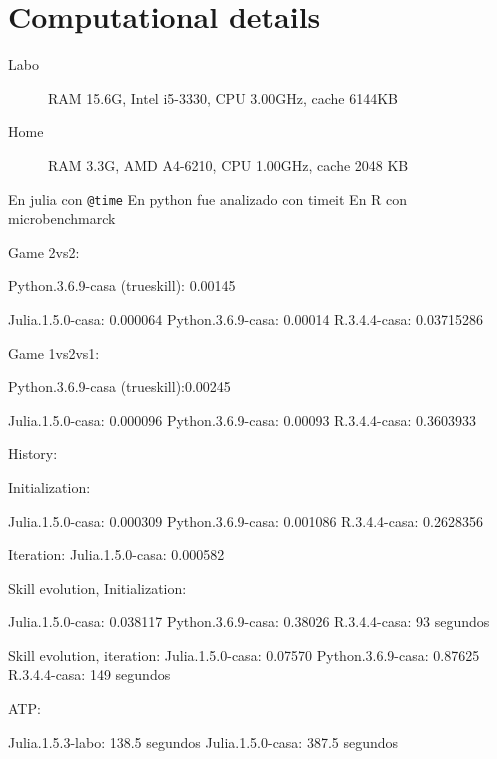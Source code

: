 \documentclass[article]{jss}
\begin{document}

\section*{Computational details}
% 


\begin{description}
 \item[Labo] RAM 15.6G, Intel i5-3330, CPU 3.00GHz, cache 6144KB
 \item[Home] RAM 3.3G, AMD A4-6210, CPU 1.00GHz, cache 2048 KB
\end{description}


En julia con \texttt{@time}
En python fue analizado con timeit
En R con microbenchmarck

Game 2vs2:

Python.3.6.9-casa (trueskill): 0.00145

Julia.1.5.0-casa:  0.000064
Python.3.6.9-casa: 0.00014
R.3.4.4-casa:      0.03715286

Game 1vs2vs1:

Python.3.6.9-casa (trueskill):0.00245

Julia.1.5.0-casa:  0.000096
Python.3.6.9-casa: 0.00093
R.3.4.4-casa: 0.3603933

History:

Initialization: 

Julia.1.5.0-casa:  0.000309
Python.3.6.9-casa: 0.001086
R.3.4.4-casa: 0.2628356

Iteration:
Julia.1.5.0-casa: 0.000582

Skill evolution, Initialization:

Julia.1.5.0-casa:  0.038117
Python.3.6.9-casa: 0.38026
R.3.4.4-casa: 93 segundos

Skill evolution, iteration:
Julia.1.5.0-casa:  0.07570
Python.3.6.9-casa: 0.87625
R.3.4.4-casa: 149 segundos

ATP:

Julia.1.5.3-labo: 138.5 segundos
Julia.1.5.0-casa: 387.5 segundos
\end{document}

